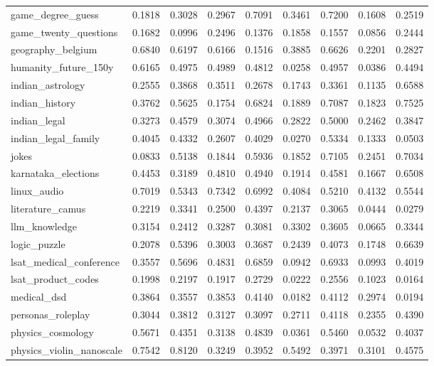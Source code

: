 \documentclass[pdflatex,sn-mathphys-num]{sn-jnl}%
\theoremstyle{thmstyleone}%
\theoremstyle{thmstyletwo}%
\theoremstyle{thmstylethree}%
\begin{document}
\begin{appendices}
\begin{landscape}
\begin{longtable}{@{}p{3.8cm}cccccccc@{}}
game\_degree\_guess & 0.1818 & 0.3028 & 0.2967 & 0.7091 & 0.3461 & 0.7200 & 0.1608 & 0.2519 \\
game\_twenty\_questions & 0.1682 & 0.0996 & 0.2496 & 0.1376 & 0.1858 & 0.1557 & 0.0856 & 0.2444 \\
geography\_belgium & 0.6840 & 0.6197 & 0.6166 & 0.1516 & 0.3885 & 0.6626 & 0.2201 & 0.2827 \\
humanity\_future\_150y & 0.6165 & 0.4975 & 0.4989 & 0.4812 & 0.0258 & 0.4957 & 0.0386 & 0.4494 \\
indian\_astrology & 0.2555 & 0.3868 & 0.3511 & 0.2678 & 0.1743 & 0.3361 & 0.1135 & 0.6588 \\
indian\_history & 0.3762 & 0.5625 & 0.1754 & 0.6824 & 0.1889 & 0.7087 & 0.1823 & 0.7525 \\
indian\_legal & 0.3273 & 0.4579 & 0.3074 & 0.4966 & 0.2822 & 0.5000 & 0.2462 & 0.3847 \\
indian\_legal\_family & 0.4045 & 0.4332 & 0.2607 & 0.4029 & 0.0270 & 0.5334 & 0.1333 & 0.0503 \\
jokes & 0.0833 & 0.5138 & 0.1844 & 0.5936 & 0.1852 & 0.7105 & 0.2451 & 0.7034 \\
karnataka\_elections & 0.4453 & 0.3189 & 0.4810 & 0.4940 & 0.1914 & 0.4581 & 0.1667 & 0.6508 \\
linux\_audio & 0.7019 & 0.5343 & 0.7342 & 0.6992 & 0.4084 & 0.5210 & 0.4132 & 0.5544 \\
literature\_camus & 0.2219 & 0.3341 & 0.2500 & 0.4397 & 0.2137 & 0.3065 & 0.0444 & 0.0279 \\
llm\_knowledge & 0.3154 & 0.2412 & 0.3287 & 0.3081 & 0.3302 & 0.3605 & 0.0665 & 0.3344 \\
logic\_puzzle & 0.2078 & 0.5396 & 0.3003 & 0.3687 & 0.2439 & 0.4073 & 0.1748 & 0.6639 \\
lsat\_medical\_conference & 0.3557 & 0.5696 & 0.4831 & 0.6859 & 0.0942 & 0.6933 & 0.0993 & 0.4019 \\
lsat\_product\_codes & 0.1998 & 0.2197 & 0.1917 & 0.2729 & 0.0222 & 0.2556 & 0.1023 & 0.0164 \\
medical\_dsd & 0.3864 & 0.3557 & 0.3853 & 0.4140 & 0.0182 & 0.4112 & 0.2974 & 0.0194 \\
personas\_roleplay & 0.3044 & 0.3812 & 0.3127 & 0.3097 & 0.2711 & 0.4118 & 0.2355 & 0.4390 \\
physics\_cosmology & 0.5671 & 0.4351 & 0.3138 & 0.4839 & 0.0361 & 0.5460 & 0.0532 & 0.4037 \\
physics\_violin\_nanoscale & 0.7542 & 0.8120 & 0.3249 & 0.3952 & 0.5492 & 0.3971 & 0.3101 & 0.4575 \\

\end{longtable}
\end{landscape}
\end{appendices}
\end{document}
